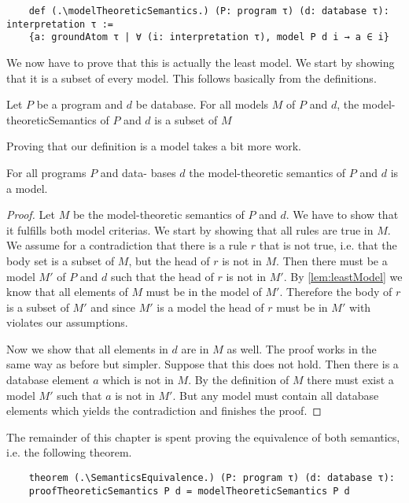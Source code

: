 \begin{lstlisting}
    def (.\modelTheoreticSemantics.) (P: program τ) (d: database τ): interpretation τ := 
    {a: groundAtom τ | ∀ (i: interpretation τ), model P d i → a ∈ i}
\end{lstlisting}

We now have to prove that this is actually the least model. We start by showing that it is a subset of every model. This follows basically from the definitions.

\begin{lemma}[\leastModel]\label{lem:leastModel}
    Let $P$ be a program and $d$ be database. For all models $M$ of $P$ and $d$, the model-theoreticSemantics of $P$ and $d$ is a subset of $M$
\end{lemma}

Proving that our definition is a model takes a bit more work.

\begin{lemma}[\modelTheoreticSemanticsIsModel]\label{lem:modelMTS}
    For all programs $P$ and data- bases $d$ the model-theoretic semantics of $P$ and $d$ is a model.
\end{lemma}
\begin{proof}
    Let $M$ be the model-theoretic semantics of $P$ and $d$. We have to show that it fulfills both model criterias.
    We start by showing that all rules are true in $M$. We assume for a contradiction that there is a rule $r$ that is not true, i.e. that the body set is a subset of $M$, but the head of $r$ is not in $M$. Then there must be a model $M'$ of $P$ and $d$ such that the head of $r$ is not in $M'$. By \cref{lem:leastModel} we know that all elements of $M$ must be in the model of $M'$. Therefore the body of $r$ is a subset of $M'$ and since $M'$ is a model the head of $r$ must be in $M'$ with violates our assumptions.

    Now we show that all elements in $d$ are in $M$ as well. The proof works in the same way as before but simpler. Suppose that this does not hold. Then there is a database element $a$ which is not in $M$. By the definition of $M$ there must exist a model $M'$ such that $a$ is not in $M'$. But any model must contain all database elements which yields the contradiction and finishes the proof.
\end{proof}

The remainder of this chapter is spent proving the equivalence of both semantics, i.e. the following theorem.

\begin{lstlisting}
    theorem (.\SemanticsEquivalence.) (P: program τ) (d: database τ): 
    proofTheoreticSemantics P d = modelTheoreticSemantics P d
\end{lstlisting}

